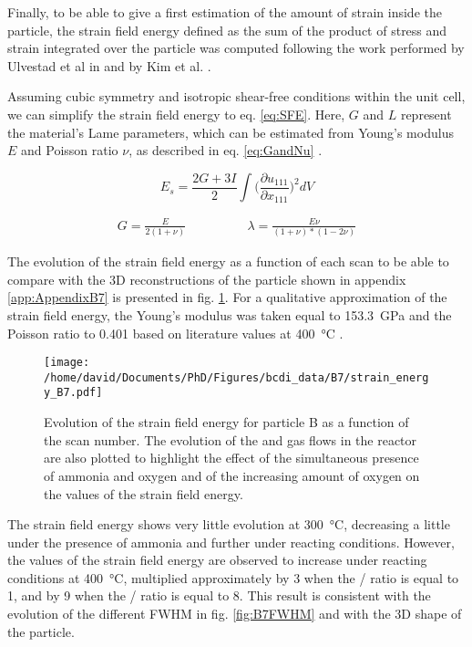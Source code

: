 Finally, to be able to give a first estimation of the amount of strain inside the particle, the strain field energy defined as the sum of the product of stress and strain integrated over the particle \parencite{Cahn1959} was computed following the work performed by Ulvestad et al in \cite*{Ulvestad2015a} and by Kim et al. \cite*{Kim2019}.

Assuming cubic symmetry and isotropic shear-free conditions within the unit cell, we can simplify the strain field energy to eq. \ref{eq:SFE}.
Here, $G$ and $L$ represent the material's Lame parameters, which can be estimated from Young's modulus $E$ and Poisson ratio $\nu$, as described in eq. \ref{eq:GandNu} \parencite{Mavko2020}.

\begin{equation}
    E_s = \frac{2G + 3I}{2} \int \Big( \frac{\partial u_{111}}{\partial x_{111}}\Big)^2 dV
    \label{eq:SFE}
\end{equation}

\begin{align}
    G = \frac{E}{2(1+\nu)} \qquad & \qquad \lambda = \frac{E \nu}{(1+\nu)*(1-2\nu)}
    \label{eq:GandNu}
\end{align}

The evolution of the strain field energy as a function of each scan to be able to compare with the 3D reconstructions of the particle shown in appendix \ref{app:AppendixB7} is presented in fig. \ref{fig:B7SFE}.
For a qualitative approximation of the strain field energy, the Young's modulus was taken equal to \qty{153.3}{\giga\pascal} and the Poisson ratio to \num{0.401} based on literature values at \qty{400}{\degreeCelsius} \parencite{Matthey2022}.

\begin{figure}[!htb]
    \centering
    \texttt{[image: /home/david/Documents/PhD/Figures/bcdi\_data/B7/strain\_energy\_B7.pdf]}
    \caption{
        Evolution of the strain field energy for particle B as a function of the scan number.
        The evolution of the  and  gas flows in the reactor are also plotted to highlight the effect of the simultaneous presence of ammonia and oxygen and of the increasing amount of oxygen on the values of the strain field energy.
    }
    \label{fig:B7SFE}
\end{figure}

The strain field energy shows very little evolution at \qty{300}{\degreeCelsius}, decreasing a little under the presence of ammonia and further under reacting conditions.
However, the values of the strain field energy are observed to increase under reacting conditions at \qty{400}{\degreeCelsius}, multiplied approximately by \num{3} when the / ratio is equal to 1, and by \num{9} when the / ratio is equal to 8.
This result is consistent with the evolution of the different FWHM in fig. \ref{fig:B7FWHM} and with the 3D shape of the particle.


